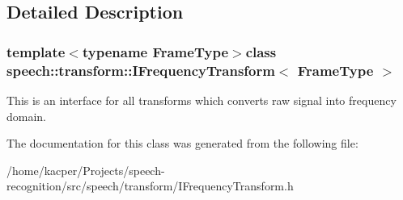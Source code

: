 \subsection{Detailed Description}
\subsubsection*{template$<$typename Frame\+Type$>$class speech\+::transform\+::\+I\+Frequency\+Transform$<$ Frame\+Type $>$}

This is an interface for all transforms which converts raw signal into frequency domain. 

The documentation for this class was generated from the following file\+:\begin{DoxyCompactItemize}
\item 
/home/kacper/\+Projects/speech-\/recognition/src/speech/transform/I\+Frequency\+Transform.\+h\end{DoxyCompactItemize}
